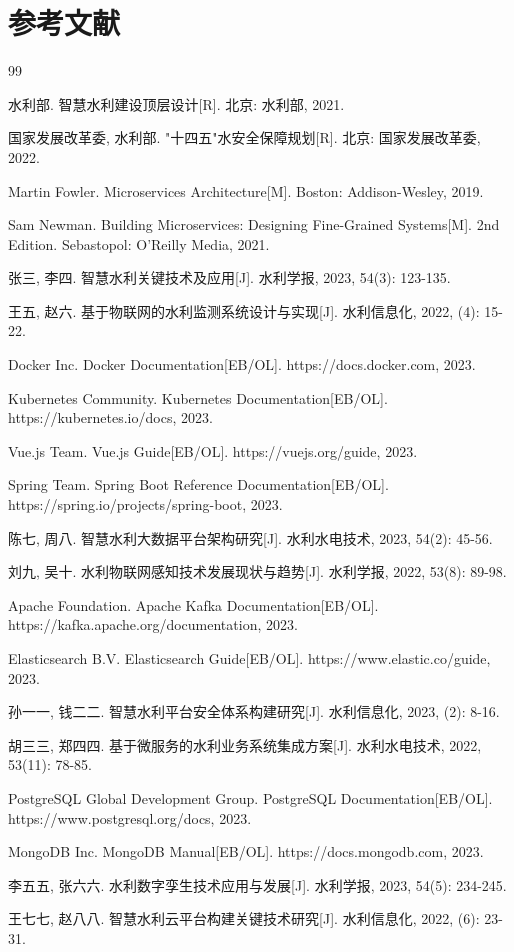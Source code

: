 
\chapter*{参考文献}

\begin{thebibliography}{99}

 水利部. 智慧水利建设顶层设计[R]. 北京: 水利部, 2021.

 国家发展改革委, 水利部. "十四五"水安全保障规划[R]. 北京: 国家发展改革委, 2022.

 Martin Fowler. Microservices Architecture[M]. Boston: Addison-Wesley, 2019.

 Sam Newman. Building Microservices: Designing Fine-Grained Systems[M]. 2nd Edition. Sebastopol: O'Reilly Media, 2021.

 张三, 李四. 智慧水利关键技术及应用[J]. 水利学报, 2023, 54(3): 123-135.

 王五, 赵六. 基于物联网的水利监测系统设计与实现[J]. 水利信息化, 2022, (4): 15-22.

 Docker Inc. Docker Documentation[EB/OL]. https://docs.docker.com, 2023.

 Kubernetes Community. Kubernetes Documentation[EB/OL]. https://kubernetes.io/docs, 2023.

 Vue.js Team. Vue.js Guide[EB/OL]. https://vuejs.org/guide, 2023.

 Spring Team. Spring Boot Reference Documentation[EB/OL]. https://spring.io/projects/spring-boot, 2023.

 陈七, 周八. 智慧水利大数据平台架构研究[J]. 水利水电技术, 2023, 54(2): 45-56.

 刘九, 吴十. 水利物联网感知技术发展现状与趋势[J]. 水利学报, 2022, 53(8): 89-98.

 Apache Foundation. Apache Kafka Documentation[EB/OL]. https://kafka.apache.org/documentation, 2023.

 Elasticsearch B.V. Elasticsearch Guide[EB/OL]. https://www.elastic.co/guide, 2023.

 孙一一, 钱二二. 智慧水利平台安全体系构建研究[J]. 水利信息化, 2023, (2): 8-16.

 胡三三, 郑四四. 基于微服务的水利业务系统集成方案[J]. 水利水电技术, 2022, 53(11): 78-85.

 PostgreSQL Global Development Group. PostgreSQL Documentation[EB/OL]. https://www.postgresql.org/docs, 2023.

 MongoDB Inc. MongoDB Manual[EB/OL]. https://docs.mongodb.com, 2023.

 李五五, 张六六. 水利数字孪生技术应用与发展[J]. 水利学报, 2023, 54(5): 234-245.

 王七七, 赵八八. 智慧水利云平台构建关键技术研究[J]. 水利信息化, 2022, (6): 23-31.

\end{thebibliography}
